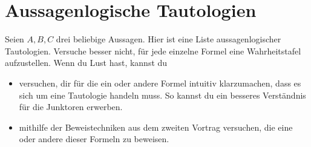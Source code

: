 \documentclass[12pt,BCOR1cm,ngerman,DIV15,fleqn,chapterprefix,headings=small]{ST1-book}
\begin{document}
\section*{Aussagenlogische Tautologien}
 Seien $A,B,C$ drei beliebige Aussagen. Hier ist eine Liste aussagenlogischer Tautologien. Versuche besser nicht, für jede einzelne Formel eine Wahrheitstafel aufzustellen. Wenn du Lust hast, kannst du
 \begin{itemize}
  \item versuchen, dir für die ein oder andere Formel intuitiv klarzumachen, dass es sich um eine Tautologie handeln muss. So kannst du ein besseres Verständnis für die Junktoren erwerben.
  \item mithilfe der Beweistechniken aus dem zweiten Vortrag versuchen, die eine oder andere dieser Formeln zu beweisen.
 \end{itemize}
 \begingroup
\allowdisplaybreaks
\end{document}
